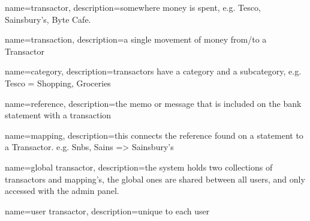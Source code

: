 {
  name={transactor},
  description={somewhere money is spent, e.g. Tesco, Sainsbury's, Byte Cafe.}
}

{
  name={transaction},
  description={a single movement of money from/to a Transactor}
}

{
  name={category},
  description={transactors have a category and a subcategory, e.g. Tesco = Shopping, Groceries}
}

{
  name={reference},
  description={the memo or message that is included on the bank statement with a transaction}
}

{
  name={mapping},
  description={this connects the reference found on a statement to a Transactor. e.g. Snbs, Sains => Sainsbury's}
}

{
  name={global transactor},
  description={the system holds two collections of transactors and mapping's, the global ones
are shared between all users, and only accessed with the admin panel.}
}

{
  name={user transactor},
  description={unique to each user}
}